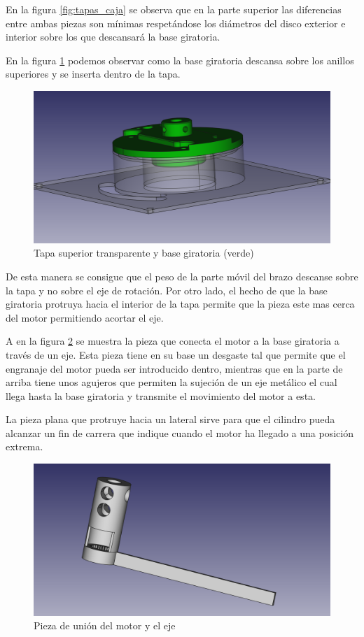 En la figura \ref{fig:tapas_caja} se observa que en la parte superior las diferencias entre ambas piezas son mínimas respetándose los diámetros del disco exterior e interior sobre los que descansará la base giratoria.

En la figura \ref{fig:tapas_caja_con_disco} podemos observar como la base giratoria descansa sobre los anillos superiores y se inserta dentro de la tapa.

 \begin{figure}[H]
    \centering
    \includegraphics[width=.9\linewidth]{pictures/TapaSuperiorConDisco.png}
    \caption{Tapa superior transparente y base giratoria (verde)}
    \label{fig:tapas_caja_con_disco}
\end{figure}

De esta manera se consigue que el peso de la parte móvil del brazo descanse sobre la tapa y no sobre el eje de rotación. Por otro lado, el hecho de que la base giratoria protruya hacia el interior de la tapa permite que la pieza este mas cerca del motor permitiendo acortar el eje.

A en la figura \ref{fig:cilindro_con_pletina} se muestra la pieza que conecta el motor a la base giratoria a través de un eje. Esta pieza tiene en su base un desgaste tal que permite que el engranaje del motor pueda ser introducido dentro, mientras que en la parte de arriba tiene unos agujeros que permiten la sujeción de un eje metálico el cual llega hasta la base giratoria y transmite el movimiento del motor a esta.

La pieza plana que protruye hacia un lateral sirve para que el cilindro pueda alcanzar un fin de carrera que indique cuando el motor ha llegado a una posición extrema.

\begin{figure}[H]
    \centering
    \includegraphics[width=.9\linewidth]{pictures/CilindroConPletina.png}
    \caption{Pieza de unión del motor y el eje}
    \label{fig:cilindro_con_pletina}
\end{figure}

